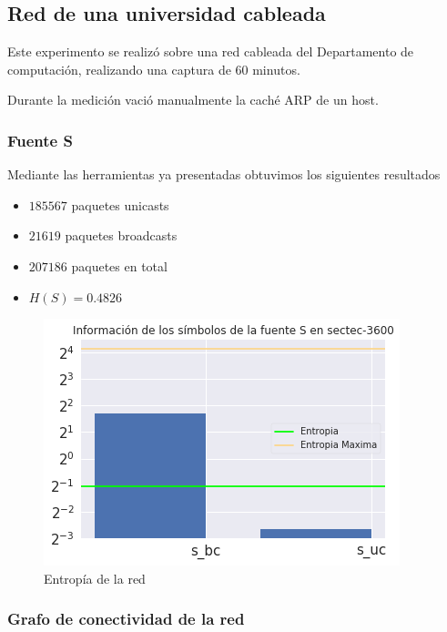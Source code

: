 
\subsection{Red de una universidad cableada}

Este experimento se realizó sobre una red cableada del Departamento de computación, realizando una captura de 60 minutos. 

Durante la medición vació manualmente la caché ARP de un host.


\subsubsection{Fuente S}


Mediante las herramientas ya presentadas obtuvimos los siguientes resultados

\begin{itemize}
 \item $185567$ paquetes unicasts
 \item $21619$ paquetes broadcasts
 \item $207186$ paquetes en total
 \item $H(S) = 0.4826$
\end{itemize}


\begin{figure}[H]
   \centering
       \includegraphics[page=1,width=.70\textwidth]{../img/sectec}
 \caption{Entropía de la red}
 \label{fig:barras-sectec}
\end{figure}


 \subsubsection{Grafo de conectividad de la red}


